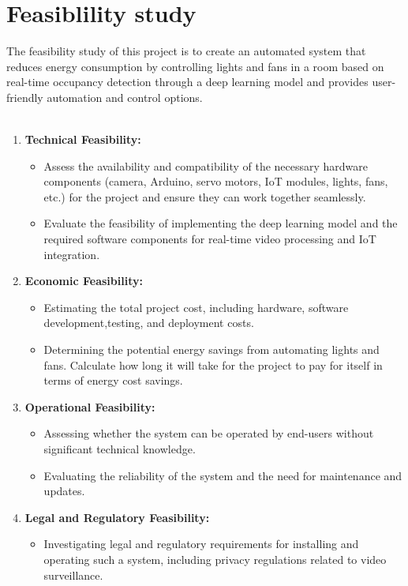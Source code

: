 \documentclass[12pt,a4paper]{report}
\begin{document}
\section*{Feasiblility study}
The feasibility study of this project is to create an automated system that reduces energy consumption by controlling lights and fans in a room based on real-time occupancy detection through a deep learning model and provides user-friendly automation and control options.\\ \\
\begin{enumerate}
    \item \textbf{Technical Feasibility:}
     \begin{itemize}
     \item Assess the availability and compatibility of the necessary hardware components (camera, Arduino, servo motors, IoT modules, lights, fans, etc.) for the project and ensure they can work together seamlessly.
     \item Evaluate the feasibility of implementing the deep learning model and the required software components for real-time video processing and IoT integration.
     \end{itemize}
    \item \textbf{Economic Feasibility:}
     \begin{itemize}
     \item Estimating the total project cost, including hardware, software development,testing, and deployment costs.
     \item Determining the potential energy savings from automating lights and fans. Calculate how long it will take for the project to pay for itself in terms of energy cost savings.
     \end{itemize}
    \item \textbf{Operational Feasibility:}
     \begin{itemize}
     \item Assessing whether the system can be operated by end-users without significant technical knowledge.
     \item Evaluating the reliability of the system and the need for maintenance and updates.
     \end{itemize}
    \item \textbf{Legal and Regulatory Feasibility:}
     \begin{itemize}
     \item Investigating legal and regulatory requirements for installing and operating such a system, including privacy regulations related to video surveillance.

\end{itemize}
\end{enumerate}
\end{document}
